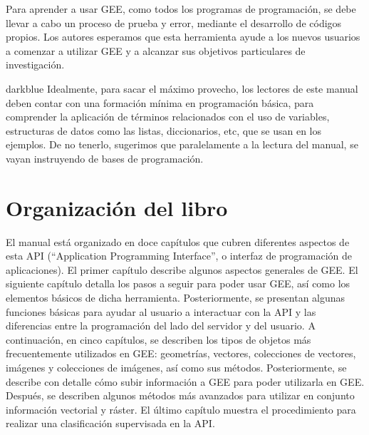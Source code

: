 \documentclass[
  12pt,
  letterpaper,
  twoside]{book}
\begin{document}
Para aprender a usar GEE, como todos los programas de programación, se debe llevar a cabo un proceso de prueba y error, mediante el desarrollo de códigos propios. Los autores esperamos que esta herramienta ayude a los nuevos usuarios a comenzar a utilizar GEE y a alcanzar sus objetivos particulares de investigación.

\begin{bluebox2}

\begin{awesomeblock}{5pt}{\faLightbulb}{darkblue}
Idealmente, para sacar el máximo provecho, los lectores de este manual deben contar con una formación mínima en programación básica, para comprender la aplicación de términos relacionados con el uso de variables, estructuras de datos como las listas, diccionarios, etc, que se usan en los ejemplos. De no tenerlo, sugerimos que paralelamente a la lectura del manual, se vayan instruyendo de bases de programación.

\end{awesomeblock}

\end{bluebox2}

\hypertarget{organizaciuxf3n-del-libro}{%
\section{Organización del libro}\label{organizaciuxf3n-del-libro}}

El manual está organizado en doce capítulos que cubren diferentes aspectos de esta API (``Application Programming Interface'', o interfaz de programación de aplicaciones). El primer capítulo describe algunos aspectos generales de GEE. El siguiente capítulo detalla los pasos a seguir para poder usar GEE, así como los elementos básicos de dicha herramienta. Posteriormente, se presentan algunas funciones básicas para ayudar al usuario a interactuar con la API y las diferencias entre la programación del lado del servidor y del usuario. A continuación, en cinco capítulos, se describen los tipos de objetos más frecuentemente utilizados en GEE: geometrías, vectores, colecciones de vectores, imágenes y colecciones de imágenes, así como sus métodos. Posteriormente, se describe con detalle cómo subir información a GEE para poder utilizarla en GEE. Después, se describen algunos métodos más avanzados para utilizar en conjunto información vectorial y ráster. El último capítulo muestra el procedimiento para realizar una clasificación supervisada en la API.
\end{document}
